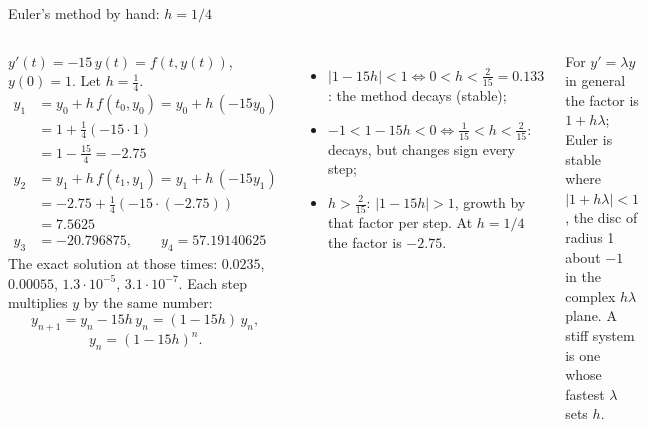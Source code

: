 \documentclass[aspectratio=169,11pt]{beamer}
\begin{document}
\begin{frame}{Euler's method by hand: $h = 1/4$}
\label{fr:byhand}
\begin{columns}[T]
\footnotesize
$y'(t) = -15\,y(t) = f(t, y(t))$, $y(0) = 1$. Let $h = \tfrac14$.
\begin{align*}
 y_1 &= y_0 + h\,f(t_0, y_0) = y_0 + h\,(-15 y_0) \\
     &= 1 + \tfrac14 (-15 \cdot 1) \\
     &= 1 - \tfrac{15}{4} = -2.75 \\[2pt]
 y_2 &= y_1 + h\,f(t_1, y_1) = y_1 + h\,(-15 y_1) \\
     &= -2.75 + \tfrac14 (-15 \cdot (-2.75)) \\
     &= 7.5625 \\[2pt]
 y_3 &= -20.796875, \qquad y_4 = 57.19140625
\end{align*}
The exact solution at those times: $0.0235$, $0.00055$, $1.3 \cdot 10^{-5}$, $3.1 \cdot 10^{-7}$.
\footnotesize
{} Each step multiplies $y$ by the same number:
\[ y_{n+1} = y_n - 15 h\, y_n = (1 - 15h)\, y_n, \]
\[ y_n = (1-15h)^n. \]
\begin{itemize}
  \item $|1 - 15h| < 1 \iff 0 < h < \tfrac{2}{15} = 0.133$: the method decays (stable);
  \item $-1 < 1 - 15h < 0 \iff \tfrac{1}{15} < h < \tfrac{2}{15}$: decays, but changes sign every step;
  \item $h > \tfrac{2}{15}$: $|1-15h| > 1$, growth by that factor per step. At $h = 1/4$ the factor is $-2.75$.
\end{itemize}
For $y' = \lambda y$ in general the factor is $1 + h\lambda$; Euler is stable where $|1 + h\lambda| < 1$, the disc of radius 1 about $-1$ in the complex $h\lambda$ plane. A stiff system is one whose fastest $\lambda$ sets $h$.
\end{columns}
\end{frame}
\end{document}
